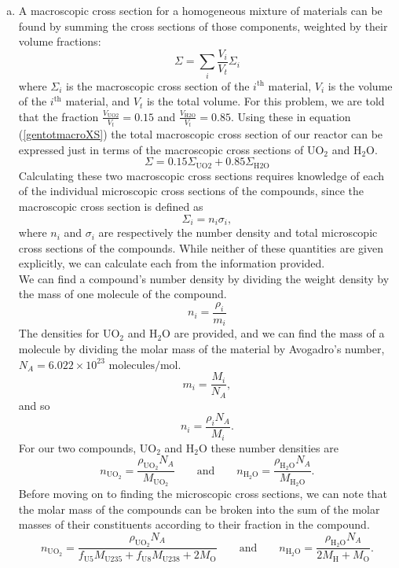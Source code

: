 \documentclass{report}
\begin{document}
\begin{enumerate}[a)]

\item 

A macroscopic cross section for a homogeneous mixture of materials can be found by summing the cross sections of those components, weighted by their volume fractions: 
\begin{equation}
\label{gentotmacroXS}
\Sigma = \sum_{i} \frac{V_i}{V_t}\Sigma_i
\end{equation}
where $\Sigma_i$ is the macroscopic cross section of the $i^{\text{th}}$ material, $V_i$ is the volume of the $i^{\text{th}}$ material, and $V_t$ is the total volume. For this problem, we are told that the fraction $\frac{V_{\text{UO2}}}{V_t} = 0.15$ and $\frac{V_{\text{H2O}}}{V_t} = 0.85$. Using these in equation (\ref{gentotmacroXS}) the total macroscopic cross section of our reactor can be expressed just in terms of the macroscopic cross sections of UO$_2$ and H$_2$O.
\begin{equation}
\label{totmacroXS}
\Sigma = 0.15\Sigma_{\text{UO2}} + 0.85\Sigma_{\text{H2O}}
\end{equation}
Calculating these two macroscopic cross sections requires knowledge of each of the individual microscopic cross sections of the compounds, since the macroscopic cross section is defined as
\begin{equation}
\label{macroXSi}
\Sigma_i = n_i\sigma_i ,
\end{equation}
where $n_i$ and $\sigma_i$ are respectively the number density and total microscopic cross sections of the compounds. While neither of these quantities are given explicitly, we can calculate each from the information provided. 
\-\\

We can find a compound's number density by dividing the weight density by the mass of one molecule of the compound. 
$$ n_i = \frac{\rho_i}{m_i} $$
The densities for UO$_2$ and H$_2$O are provided, and we can find the mass of a molecule by dividing the molar mass of the material by Avogadro's number, $N_A = 6.022\times10^{23}\text{ molecules/mol}$.
$$ m_i = \frac{M_i}{N_A}, $$
and so
$$ n_i = \frac{\rho_i N_A}{M_i} .$$
For our two compounds, UO$_2$ and H$_2$O these number densities are
$$ n_{\text{UO}_2} = \frac{\rho_{\text{UO}_2} N_A}{M_{\text{UO}_2}} \qquad\text{and}\qquad n_{\text{H}_2\text{O}} = \frac{\rho_{\text{H}_2\text{O}} N_A}{M_{\text{H}_2\text{O}}} .$$
Before moving on to finding the microscopic cross sections, we can note that the molar mass of the compounds can be broken into the sum of the molar masses of their constituents according to their fraction in the compound.
$$ n_{\text{UO}_2} = \frac{\rho_{\text{UO}_2} N_A}{f_{\text{U}5}M_{\text{U235}} + f_{\text{U}8}M_{\text{U238}} + 2M_{\text{O}}} \qquad\text{and}\qquad n_{\text{H}_2\text{O}} = \frac{\rho_{\text{H}_2\text{O}} N_A}{2M_{\text{H}} + M_\text{O}} .$$
\-\\


\end{enumerate}
\end{document}
